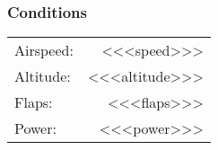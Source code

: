 % 
% 
%

 \subsubsection*{Conditions}
 \noindent\begin{tabular}{p{1.5 in}r}
 Airspeed:&<<<speed>>>\\
 Altitude:&<<<altitude>>>\\
 Flaps:&<<<flaps>>>\\
 Power:&<<<power>>>\\
 \end{tabular}
